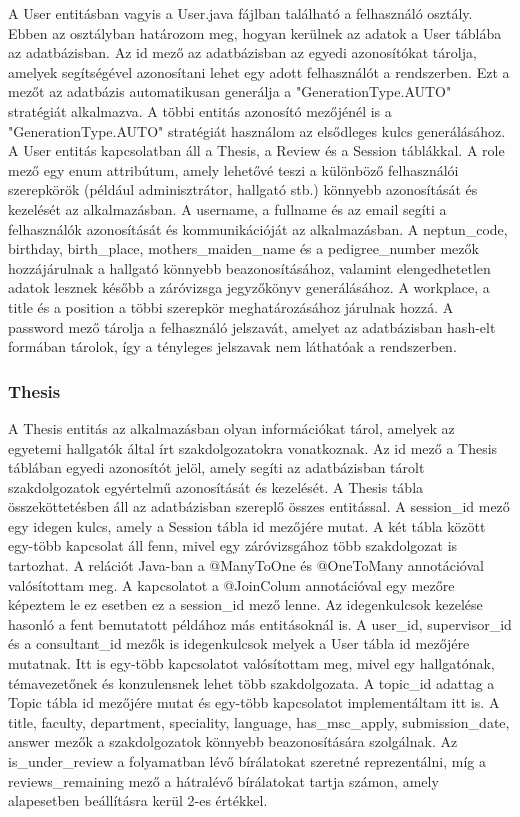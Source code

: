 A User entitásban vagyis a User.java fájlban található a felhasználó osztály. Ebben az osztályban határozom meg, hogyan kerülnek az adatok a User táblába az adatbázisban. Az id mező az adatbázisban az egyedi azonosítókat tárolja, amelyek segítségével azonosítani lehet egy adott felhasználót a rendszerben. Ezt a mezőt az adatbázis automatikusan generálja a "GenerationType.AUTO" stratégiát alkalmazva. A többi entitás azonosító mezőjénél is a "GenerationType.AUTO" stratégiát használom az elsődleges kulcs generálásához. A User entitás kapcsolatban áll a Thesis, a Review és a Session táblákkal. A role mező egy enum attribútum, amely lehetővé teszi a különböző felhasználói szerepkörök (például adminisztrátor, hallgató stb.) könnyebb azonosítását és kezelését az alkalmazásban. A username, a fullname és az email segíti a felhasználók azonosítását és kommunikációját az alkalmazásban. A neptun\_code, birthday, birth\_place, mothers\_maiden\_name és a pedigree\_number mezők hozzájárulnak a hallgató könnyebb beazonosításához, valamint elengedhetetlen adatok lesznek később a záróvizsga jegyzőkönyv generálásához. A workplace, a title és a position a többi szerepkör meghatározásához járulnak hozzá. A password mező tárolja a felhasználó jelszavát, amelyet az adatbázisban hash-elt formában tárolok, így a tényleges jelszavak nem láthatóak a rendszerben.


\subsubsection{Thesis}

A Thesis entitás az alkalmazásban olyan információkat tárol, amelyek az egyetemi hallgatók által írt szakdolgozatokra vonatkoznak. Az id mező a Thesis táblában egyedi azonosítót jelöl, amely segíti az adatbázisban tárolt szakdolgozatok egyértelmű azonosítását és kezelését. A Thesis tábla összeköttetésben áll az adatbázisban szereplő összes entitással. A session\_id mező egy idegen kulcs, amely a Session tábla id mezőjére mutat. A két tábla között egy-több kapcsolat áll fenn, mivel egy záróvizsgához több szakdolgozat is tartozhat. A relációt Java-ban a @ManyToOne és @OneToMany annotációval valósítottam meg. A kapcsolatot a @JoinColum annotációval egy mezőre képeztem le ez esetben ez a session\_id mező lenne. Az idegenkulcsok kezelése hasonló a fent bemutatott példához más entitásoknál is. A user\_id, supervisor\_id és a consultant\_id mezők is idegenkulcsok melyek a User tábla id mezőjére mutatnak. Itt is egy-több kapcsolatot valósítottam meg, mivel egy hallgatónak, témavezetőnek és konzulensnek lehet több szakdolgozata. A topic\_id adattag a Topic tábla id mezőjére mutat és egy-több kapcsolatot implementáltam itt is. A title, faculty, department, speciality, language, has\_msc\_apply, submission\_date, answer mezők a szakdolgozatok könnyebb beazonosítására szolgálnak. Az is\_under\_review a folyamatban lévő bírálatokat szeretné reprezentálni, míg a reviews\_remaining mező a hátralévő bírálatokat tartja számon, amely alapesetben beállításra kerül 2-es értékkel.

